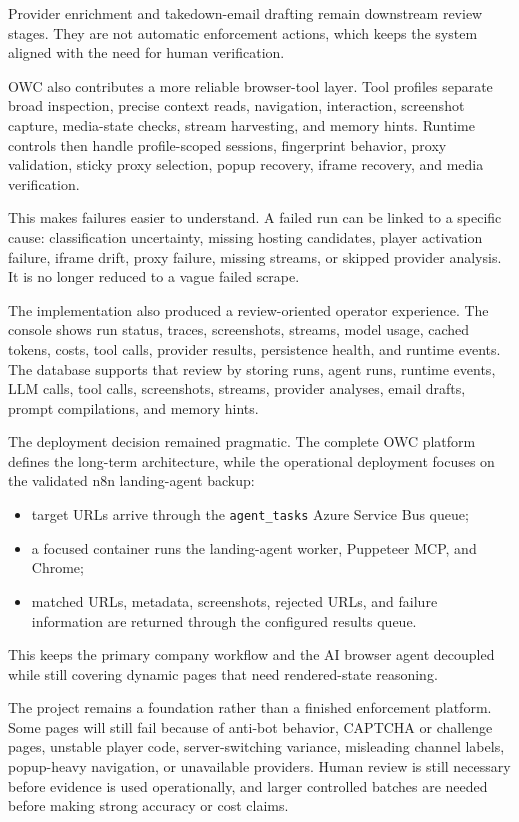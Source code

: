 Provider enrichment and takedown-email drafting remain downstream review stages. They
are not automatic enforcement actions, which keeps the system aligned with the need
for human verification.

OWC also contributes a more reliable browser-tool layer. Tool profiles separate broad
inspection, precise context reads, navigation, interaction, screenshot capture,
media-state checks, stream harvesting, and memory hints. Runtime controls then handle
profile-scoped sessions, fingerprint behavior, proxy validation, sticky proxy
selection, popup recovery, iframe recovery, and media verification.

This makes failures easier to understand. A failed run can be linked to a specific
cause: classification uncertainty, missing hosting candidates, player activation
failure, iframe drift, proxy failure, missing streams, or skipped provider analysis. It
is no longer reduced to a vague failed scrape.

The implementation also produced a review-oriented operator experience. The console
shows run status, traces, screenshots, streams, model usage, cached tokens, costs, tool
calls, provider results, persistence health, and runtime events. The database supports
that review by storing runs, agent runs, runtime events, LLM calls, tool calls,
screenshots, streams, provider analyses, email drafts, prompt compilations, and memory
hints.

The deployment decision remained pragmatic. The complete OWC platform defines the
long-term architecture, while the operational deployment focuses on the validated n8n
landing-agent backup:
\begin{itemize}
  \item target URLs arrive through the \texttt{agent\_tasks} Azure Service Bus queue;
  \item a focused container runs the landing-agent worker, Puppeteer MCP, and Chrome;
  \item matched URLs, metadata, screenshots, rejected URLs, and failure information are
  returned through the configured results queue.
\end{itemize}

This keeps the primary company workflow and the AI browser agent decoupled while still
covering dynamic pages that need rendered-state reasoning.

The project remains a foundation rather than a finished enforcement platform. Some
pages will still fail because of anti-bot behavior, CAPTCHA or challenge pages,
unstable player code, server-switching variance, misleading channel labels,
popup-heavy navigation, or unavailable providers. Human review is still necessary
before evidence is used operationally, and larger controlled batches are needed before
making strong accuracy or cost claims.

